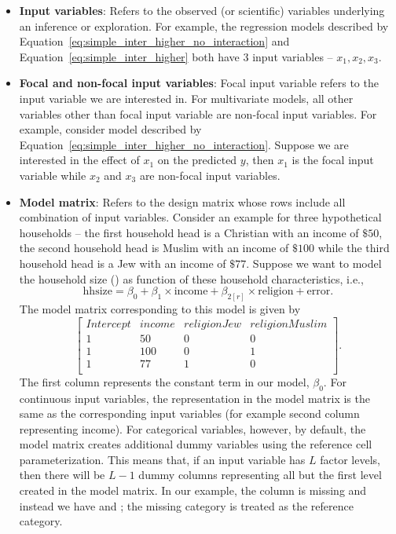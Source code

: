 \begin{itemize}
\item \textbf{Input variables}: Refers to the observed (or scientific) variables underlying an inference or exploration. For example, the regression models described by Equation~\ref{eq:simple_inter_higher_no_interaction} and Equation~\ref{eq:simple_inter_higher} both have $3$ input variables -- $x_1, x_2, x_3$.
\item \textbf{Focal and non-focal input variables}: Focal input variable refers to the input variable we are interested in. For multivariate models, all other variables other than focal input variable are non-focal input variables. For example, consider model described by Equation~\ref{eq:simple_inter_higher_no_interaction}. Suppose we are interested in the effect of $x_1$ on the predicted $y$, then $x_1$ is the focal input variable while $x_2$ and $x_3$ are non-focal input variables.
\item \textbf{Model matrix}: Refers to the design matrix whose rows include all combination of input variables. Consider an example for three hypothetical households -- the first household head is a Christian with an income of $\$ 50$, the second household head is Muslim with an income of $\$ 100$ while the third household head is a Jew with an income of $\$ 77$. Suppose we want to model the household size () as function of these household characteristics, i.e., $$\mathrm{hhsize} = \beta_0 + \beta_1\times\mathrm{income} + \beta_{2[r]}\times\mathrm{religion} + \mathrm{error}.$$ The model matrix corresponding to this model is given by
$$\begin{bmatrix}{}
 Intercept & income & religionJew & religionMuslim \\
 1 & 50 & 0 & 0 \\
  1 & 100 & 0 & 1 \\
  1 & 77 & 1 & 0 \\
\end{bmatrix}.$$ The first column represents the constant term in our model, $\beta_0$. For continuous input variables, the representation in the model matrix is the same as the corresponding input variables (for example second column representing income). For categorical variables, however, by default, the model matrix  creates additional dummy variables using the reference cell parameterization. This means that, if an input variable has $L$ factor levels, then there will be $L-1$ dummy columns representing all but the first level created in the model matrix. In our example, the column  is missing and instead we have  and ; the missing category  is treated as the reference category.

\end{itemize}
